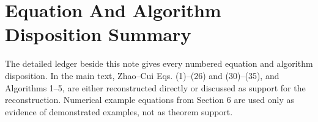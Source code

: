 \documentclass[11pt]{article}
\begin{document}
\appendix
\section{Equation And Algorithm Disposition Summary}

The detailed ledger beside this note gives every numbered equation and
algorithm disposition.  In the main text, Zhao--Cui Eqs. (1)--(26) and
(30)--(35), and Algorithms 1--5, are either reconstructed directly or discussed
as support for the reconstruction.  Numerical example equations from Section 6
are used only as evidence of demonstrated examples, not as theorem support.
\end{document}
